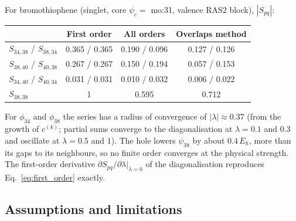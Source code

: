 \documentclass[11pt]{article}
\begin{document}
For bromothiophene (singlet, core $\psi_c = $ mo:31, valence RAS2 block), $|S_{pq}|$:
\begin{center}
\begin{tabular}{lccc}
\toprule
 & First order & All orders & Overlaps method \\
\midrule
$S_{34,38}$ / $S_{38,34}$ & 0.365 / 0.365 & 0.190 / 0.096 & 0.127 / 0.126 \\
$S_{38,40}$ / $S_{40,38}$ & 0.267 / 0.267 & 0.150 / 0.194 & 0.057 / 0.153 \\
$S_{34,40}$ / $S_{40,34}$ & 0.031 / 0.031 & 0.010 / 0.032 & 0.006 / 0.022 \\
$S_{38,38}$ & 1 & 0.595 & 0.712 \\
\bottomrule
\end{tabular}
\end{center}
For $\phi_{34}$ and $\phi_{38}$ the series has a radius of convergence of $|\lambda| \approx 0.37$ (from the growth of $c^{(k)}$; partial sums converge to the diagonalisation at $\lambda = 0.1$ and $0.3$ and oscillate at $\lambda = 0.5$ and $1$). The hole lowers $\psi_{38}$ by about $0.4\,E_h$, more than its gaps to its neighbours, so no finite order converges at the physical strength. The first-order derivative $\partial S_{pq}/\partial\lambda|_{\lambda=0}$ of the diagonalisation reproduces Eq.~\eqref{eq:first_order} exactly.

\subsection*{Assumptions and limitations}
\end{document}

